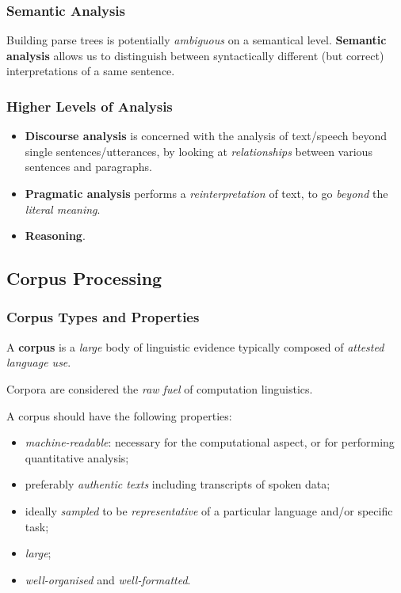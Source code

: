 \subsubsection{Semantic Analysis}
Building parse trees is potentially \emph{ambiguous} on a semantical level.
\textbf{Semantic analysis} allows us to distinguish between syntactically different (but correct) interpretations of a same sentence.

\subsubsection{Higher Levels of Analysis}
\begin{itemize}
	\item \textbf{Discourse analysis} is concerned with the analysis of text/speech beyond single sentences\fshyp{}utterances, by looking at \emph{relationships} between various sentences and paragraphs.
	\item \textbf{Pragmatic analysis} performs a \emph{reinterpretation} of text, to go \emph{beyond} the \emph{literal meaning}.
	\item \textbf{Reasoning}.
\end{itemize}

\subsection{Corpus Processing}
\subsubsection{Corpus Types and Properties}
\begin{mydef}[Corpus]
	A \textbf{corpus} is a \emph{large} body of linguistic evidence typically composed of \emph{attested language use}.
\end{mydef}
Corpora are considered the \emph{raw fuel} of computation linguistics.

A corpus should have the following properties:
\begin{itemize}
	\item \emph{machine-readable}: necessary for the computational aspect, or for performing quantitative analysis;
	\item preferably \emph{authentic texts} including transcripts of spoken data;
	\item ideally \emph{sampled} to be \emph{representative} of a particular language and/or specific task;
	\item \emph{large};
	\item \emph{well-organised} and \emph{well-formatted}.
\end{itemize}

